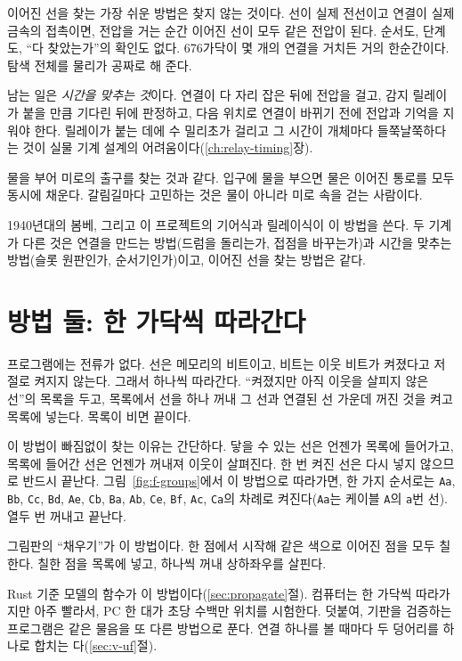 \Why 이어진 선을 찾는 가장 쉬운 방법은 찾지 않는 것이다. 선이 실제 전선이고 연결이 실제 금속의 접촉이면, 전압을
거는 순간 이어진 선이 모두 같은 전압이 된다. 순서도, 단계도, ``다 찾았는가''의 확인도 없다. 676가닥이 몇 개의
연결을 거치든 거의 한순간이다. 탐색 전체를 물리가 공짜로 해 준다.

남는 일은 \emph{시간을 맞추는 것}이다. 연결이 다 자리 잡은 뒤에 전압을 걸고, 감지 릴레이가 붙을 만큼 기다린 뒤에
판정하고, 다음 위치로 연결이 바뀌기 전에 전압과 기억을 지워야 한다. 릴레이가 붙는 데에 수 밀리초가 걸리고 그
시간이 개체마다 들쭉날쭉하다는 것이 실물 기계 설계의 어려움이다(\ref{ch:relay-timing}장).

\General 물을 부어 미로의 출구를 찾는 것과 같다. 입구에 물을 부으면 물은 이어진 통로를 모두 동시에 채운다.
갈림길마다 고민하는 것은 물이 아니라 미로 속을 걷는 사람이다.

\Ours 1940년대의 봄베, 그리고 이 프로젝트의 기어식과 릴레이식이 이 방법을 쓴다. 두 기계가 다른 것은 연결을
만드는 방법(드럼을 돌리는가, 접점을 바꾸는가)과 시간을 맞추는 방법(슬롯 원판인가, 순서기인가)이고, 이어진 선을
찾는 방법은 같다.

\section{방법 둘: 한 가닥씩 따라간다}\label{sec:f-stack}

\Why 프로그램에는 전류가 없다. 선은 메모리의 비트이고, 비트는 이웃 비트가 켜졌다고 저절로 켜지지 않는다. 그래서
하나씩 따라간다. ``켜졌지만 아직 이웃을 살피지 않은 선''의 목록을 두고, 목록에서 선을 하나 꺼내 그 선과 연결된
선 가운데 꺼진 것을 켜고 목록에 넣는다. 목록이 비면 끝이다.

이 방법이 빠짐없이 찾는 이유는 간단하다. 닿을 수 있는 선은 언젠가 목록에 들어가고, 목록에 들어간 선은 언젠가
꺼내져 이웃이 살펴진다. 한 번 켜진 선은 다시 넣지 않으므로 반드시 끝난다. 그림~\ref{fig:f-groups}에서 이 방법으로
따라가면, 한 가지 순서로는 \texttt{Aa}, \texttt{Bb}, \texttt{Cc}, \texttt{Bd}, \texttt{Ae}, \texttt{Cb}, \texttt{Ba},
\texttt{Ab}, \texttt{Ce}, \texttt{Bf}, \texttt{Ac}, \texttt{Ca}의 차례로 켜진다(\texttt{Aa}는 케이블 \texttt{A}의
\texttt{a}번 선). 열두 번 꺼내고 끝난다.

\General 그림판의 ``채우기''가 이 방법이다. 한 점에서 시작해 같은 색으로 이어진 점을 모두 칠한다. 칠한 점을
목록에 넣고, 하나씩 꺼내 상하좌우를 살핀다.

\Ours Rust 기준 모델의  함수가 이 방법이다(\ref{sec:propagate}절). 컴퓨터는 한 가닥씩 따라가지만
아주 빨라서, PC 한 대가 초당 수백만 위치를 시험한다. 덧붙여, 기판을 검증하는 프로그램은 같은 물음을 또 다른 방법으로
푼다. 연결 하나를 볼 때마다 두 덩어리를 하나로 합치는 다(\ref{sec:v-uf}절).

